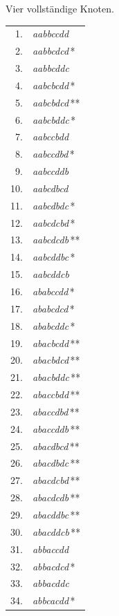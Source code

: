 \clearpage{}
\begin{center}
Vier vollständige Knoten.\par
\medskip
\begin{minipage}[t]{.31\linewidth}\centering
\begin{tabular}{r@{\ }l}
1. & \emph{aabbccdd} \\
2. & \emph{aabbcdcd}\,* \\
3. & \emph{aabbcddc} \\
4. & \emph{aabcbcdd}\,* \\
5. & \emph{aabcbdcd}\,** \\
6. & \emph{aabcbddc}\,* \\
7. & \emph{aabccbdd} \\
8. & \emph{aabccdbd}\,* \\
9. & \emph{aabccddb} \\
10. & \emph{aabcdbcd} \\
11. & \emph{aabcdbdc}\,* \\
12. & \emph{aabcdcbd}\,* \\
13. & \emph{aabcdcdb}\,** \\
14. & \emph{aabcddbc}\,* \\
15. & \emph{aabcddcb} \\
16. & \emph{ababccdd}\,* \\
17. & \emph{ababcdcd}\,* \\
18. & \emph{ababcddc}\,* \\
19. & \emph{abacbcdd}\,** \\
20. & \emph{abacbdcd}\,** \\
21. & \emph{abacbddc}\,** \\
22. & \emph{abaccbdd}\,** \\
23. & \emph{abaccdbd}\,** \\
24. & \emph{abaccddb}\,** \\
25. & \emph{abacdbcd}\,** \\
26. & \emph{abacdbdc}\,** \\
27. & \emph{abacdcbd}\,** \\
28. & \emph{abacdcdb}\,** \\
29. & \emph{abacddbc}\,** \\
30. & \emph{abacddcb}\,** \\
31. & \emph{abbaccdd} \\
32. & \emph{abbacdcd}\,* \\
33. & \emph{abbacddc} \\
34. & \emph{abbcacdd}\,* \\

\end{tabular}
\end{minipage}
\end{center}
